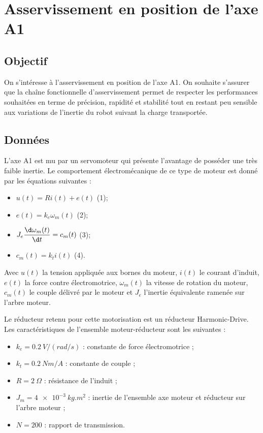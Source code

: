 \section{Asservissement en position de l'axe A1}

\subsection{Objectif}
\ifprof
\else
On s’intéresse à l’asservissement en position de l’axe A1. On souhaite s’assurer que la chaîne 
fonctionnelle d’asservissement permet de respecter les performances souhaitées en terme de 
précision, rapidité et stabilité tout en restant peu sensible aux variations de l’inertie du robot 
suivant la charge transportée. 
\fi

\subsection{Données \label{sec:6:2}} 
\ifprof
\else
L’axe A1 est mu par un servomoteur qui présente l'avantage de posséder une très faible 
inertie. Le comportement électromécanique de ce type de moteur est donné par les équations 
suivantes : 
\begin{itemize}%
\item $u(t) = Ri(t) + e(t)$ (1);
\item $e(t) = k_e \omega_m(t)$  (2);
\item $J_e \dfrac{\d \omega_m(t)}{\d t} = c_m(t)$ (3);
\item $c_m(t) = k_t i(t)$ (4).
\end{itemize}

Avec $u(t)$ la tension appliquée aux bornes du moteur, $i(t)$ le courant d’induit, $e(t)$ la force 
contre électromotrice, $\omega_m(t)$ la vitesse de rotation du moteur, $c_m(t)$ le couple délivré par le 
moteur et $J_e$ l’inertie équivalente ramenée sur l’arbre moteur. 

Le réducteur retenu pour cette motorisation est un réducteur Harmonic-Drive. Les 
caractéristiques de l’ensemble moteur-réducteur sont les suivantes : 
\begin{itemize}
\item $k_e = \SI{0,2}{V/(rad/s)}$ : constante de force électromotrice ; 
\item $k_t = \SI{0,2}{Nm/A}$ : constante de couple ; 
\item $R = \SI{2}{\Omega}$ : résistance de l’induit ; 
\item $J_m = \SI{4e-3}{kg.m^2}$ : inertie de l’ensemble axe moteur et réducteur sur l'arbre moteur ; 
\item $N = 200$ : rapport de transmission. 
\end{itemize}

